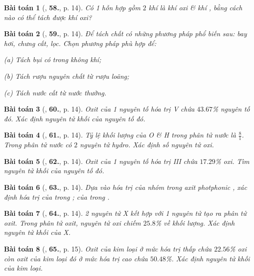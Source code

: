 \documentclass{article}
\numberwithin{equation}{section}
\newtheorem{baitoan}{Bài toán}[section]
\begin{document}
\begin{baitoan}[\cite{An2011}, \textbf{58.}, p. 14]
	Có 1 hỗn hợp gồm $2$ khí là khí oxi \& khí , bằng cách nào có  thể tách được khí oxi?
\end{baitoan}

\begin{baitoan}[\cite{An2011}, \textbf{59.}, p. 14]
	Để tách chất có những phương pháp phổ biến sau: bay hơi, chưng cất, lọc. Chọn phương pháp phù hợp để:
	\begin{enumerate*}
		\item[(a)] Tách bụi có trong không khí;
		\item[(b)] Tách rượu nguyên chất từ rượu loãng;
		\item[(c)] Tách nước cất từ nước thường.
	\end{enumerate*}
\end{baitoan}

\begin{baitoan}[\cite{An2011}, \textbf{60.}, p. 14]
	Oxit của 1 nguyên tố hóa trị V chứa $43.67$\% nguyên tố đó. Xác định nguyên tử khối của nguyên tố đó.
\end{baitoan}

\begin{baitoan}[\cite{An2011}, \textbf{61.}, p. 14]
	Tỷ lệ khối lượng của O \& H trong phân tử nước là $\frac{8}{1}$. Trong phân tử nước có $2$ nguyên tử hydro. Xác định số nguyên tử oxi.
\end{baitoan}

\begin{baitoan}[\cite{An2011}, \textbf{62.}, p. 14]
	Oxit của 1 nguyên tố hóa trị III chứa $17.29$\% oxi. Tìm nguyên tử khối của nguyên tố đó.
\end{baitoan}

\begin{baitoan}[\cite{An2011}, \textbf{63.}, p. 14]
	Dựa vào hóa trị của nhóm  trong axit photphonic , xác định hóa trị của  trong ; của  trong .
\end{baitoan}

\begin{baitoan}[\cite{An2011}, \textbf{64.}, p. 14]
	2 nguyên tử X kết hợp với 1 nguyên tử  tạo ra phân tử oxit. Trong phân tử oxit, nguyên tử oxi chiếm $25.8$\% về khối lượng. Xác định nguyên tử khối của X.
\end{baitoan}

\begin{baitoan}[\cite{An2011}, \textbf{65.}, p. 15]
	Oxit của kim loại ở mức hóa trị thấp chứa $22.56$\% oxi còn oxit của kim loại đó ở mức hóa trị cao chứa $50.48$\%. Xác định nguyên tử khối của kim loại.
\end{baitoan}
\end{document}
